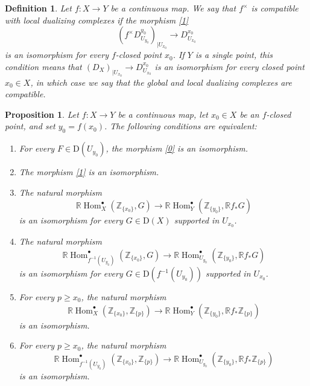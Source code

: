 \documentclass[amssymb,amscd,11pt,20pt]{amsart}
\newcommand{\ZZ}{{\mathbb Z}}
\newcommand{\RR}{\mathbb R}
\newcommand{\0}{\mathbf 0}
\DeclareMathOperator{\Hom}{{Hom}}
\newcommand{\pun}{{\scriptscriptstyle \bullet}}
\theoremstyle{plain}
\newtheorem{prop}[thm]{Proposition}
\newtheorem{defn}[thm]{Definition}
\numberwithin{equation}{thm}
\begin{document}
\begin{defn}\label{proper-2} {\rm Let $f\colon X\to Y$ be a continuous map. We say that {\em $f^\times$ is compatible with local dualizing complexes} if the morphism \eqref{1}
\[ ( f^\times D_{U_{y_0}}^{y_0})_{\vert U_{x_0}}\to    D_{U_{x_0}}^{x_0}\] is an isomorphism for every $f$-closed point $x_0$. If $Y$ is a single point, this condition means that $(D_X)_{\vert U_{x_0}}\to D_{U_{x_0}}^{x_0}$ is an isomorphism for every closed point $x_0\in X$, in which case we say that the global and local dualizing complexes are compatible.}
\end{defn}


\begin{prop}\label{equivalencias} Let $f\colon X\to Y$ be a continuous map, let $x_0\in X$ be an $f$-closed point, and set $y_0=f(x_0)$. The following conditions are equivalent:
\begin{enumerate} 
\item For every $F\in \mathrm{D}(U_{y_0})$,  the morphism \eqref{0} is an isomorphism.
\item The morphism \eqref{1} is an isomorphism.
\item The natural morphism \[\RR\Hom_{X}^\pun(\ZZ_{\{x_0\}}, G)\to \RR\Hom_{Y}^\pun(\ZZ_{\{y_0\}},\RR f_* G)\] is an isomorphism  for every $G\in \mathrm{D}(X)$ supported in $U_{x_0}$.
\item[(3')] The natural morphism \begin{equation}\label{2}\RR\Hom_{f^{-1}(U_{y_0})}^\pun(\ZZ_{\{x_0\}}, G)\to \RR\Hom_{U_{y_0}}^\pun(\ZZ_{\{y_0\}},\RR f_* G)\end{equation} is an isomorphism for every $G\in \mathrm{D}(f^{-1}(U_{y_0}))$ supported in $U_{x_0}$.
\item For every $p\geq x_0$, the natural morphism 
$$\RR\Hom_{X}^\pun(\ZZ_{\{x_0\}}, \ZZ_{\{p\}})\to \RR\Hom_{Y}^\pun(\ZZ_{\{y_0\}},\RR f_* \ZZ_{\{p\}})$$ is an isomorphism.
\item[(4')] For every $p\geq x_0$, the natural morphism 
$$\RR\Hom_{f^{-1}(U_{y_0})}^\pun(\ZZ_{\{x_0\}}, \ZZ_{\{p\}})\to \RR\Hom_{U_{y_0}}^\pun(\ZZ_{\{y_0\}},\RR f_* \ZZ_{\{p\}})$$ is an isomorphism.
\end{enumerate}
\end{prop}
\end{document}
